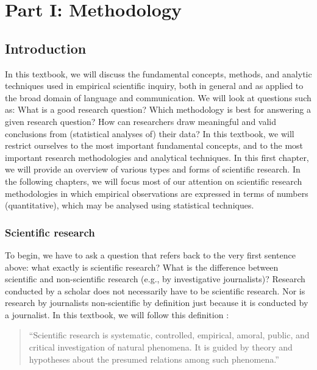\documentclass[
]{book}
\begin{document}
\hypertarget{part-part-i-methodology}{%
\part*{Part I: Methodology}\label{part-part-i-methodology}}

\hypertarget{ch-introduction}{%
\chapter{Introduction}\label{ch-introduction}}

In this textbook, we will discuss the fundamental concepts, methods, and analytic techniques used in empirical scientific inquiry, both in general and as applied to the broad domain of language and communication. We will look at questions such as: What is a good research question? Which methodology is best for answering a given research question? How can researchers draw meaningful and valid conclusions from (statistical analyses of) their data? In this textbook, we will restrict ourselves to the most important fundamental concepts, and to the most important research methodologies and analytical techniques. In this first chapter, we will provide an overview of various types and forms of scientific research. In the following chapters, we will focus most of our attention on scientific research methodologies in which empirical observations are expressed in terms of numbers (quantitative), which may be analysed using statistical techniques.

\hypertarget{sec:scientific-research}{%
\section{Scientific research}\label{sec:scientific-research}}

To begin, we have to ask a question that refers back to the very first sentence above: what exactly is scientific research? What is the difference between scientific and non-scientific research (e.g., by investigative journalists)? Research conducted by a scholar does not necessarily have to be scientific research. Nor is research by journalists non-scientific by definition just because it is conducted by a journalist. In this textbook, we will follow this definition \citep[p.14]{KL00}:

\begin{quote}
``Scientific
research is systematic, controlled, empirical, amoral, public, and
critical investigation of natural phenomena. It is guided by theory and hypotheses about the presumed relations among such phenomena.''
\end{quote}
\end{document}
